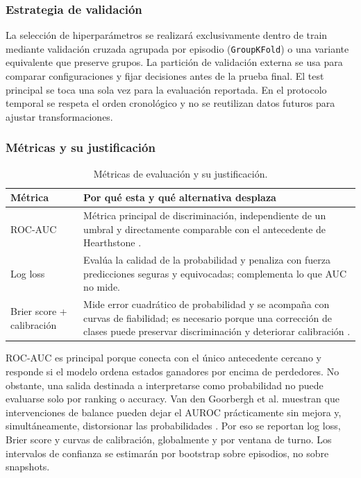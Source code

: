 \subsubsection{Estrategia de validación}
La selección de hiperparámetros se realizará exclusivamente dentro de
train mediante validación cruzada agrupada por episodio
(\texttt{GroupKFold}) o una variante equivalente que preserve grupos.
La partición de validación externa se usa para comparar configuraciones
y fijar decisiones antes de la prueba final. El test principal se toca
una sola vez para la evaluación reportada. En el protocolo temporal se
respeta el orden cronológico y no se reutilizan datos futuros para
ajustar transformaciones.

\subsubsection{Métricas y su justificación}
\begin{table}[!t]
\centering
\caption{Métricas de evaluación y su justificación.}
\label{tab:metricas}
\footnotesize
\begin{tabularx}{\columnwidth}{@{}P{2.2cm} Y@{}}
\toprule
\textbf{Métrica} & \textbf{Por qué esta y qué alternativa desplaza}\\
\midrule
ROC-AUC & Métrica principal de discriminación, independiente de un
umbral y directamente comparable con el antecedente de Hearthstone
\cite{janusz_hearthstone_2017}.\\
Log loss & Evalúa la calidad de la probabilidad y penaliza con fuerza
predicciones seguras y equivocadas; complementa lo que AUC no mide.\\
Brier score + calibración & Mide error cuadrático de probabilidad y se
acompaña con curvas de fiabilidad; es necesario porque una corrección de
clases puede preservar discriminación y deteriorar calibración
\cite{vandenGoorbergh_imbalance_2022}.\\
\bottomrule
\end{tabularx}
\end{table}

ROC-AUC es principal porque conecta con el único antecedente cercano y
responde si el modelo ordena estados ganadores por encima de perdedores.
No obstante, una salida destinada a interpretarse como probabilidad no
puede evaluarse solo por ranking o accuracy. Van den Goorbergh et al.
muestran que intervenciones de balance pueden dejar el AUROC
prácticamente sin mejora y, simultáneamente, distorsionar las
probabilidades \cite{vandenGoorbergh_imbalance_2022}. Por eso se
reportan log loss, Brier score y curvas de calibración, globalmente y
por ventana de turno. Los intervalos de confianza se estimarán por
bootstrap sobre episodios, no sobre snapshots.

